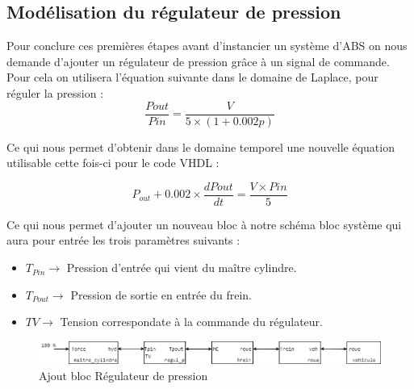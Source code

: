 \newpage
\subsection{Modélisation du régulateur de pression}

Pour conclure ces premières étapes avant d'instancier un système d'ABS on nous demande d'ajouter un régulateur de pression grâce à un signal de commande. Pour cela on utilisera l'équation suivante dans le domaine de Laplace, pour réguler la pression :
\[ \frac{Pout}{Pin} = \frac{V}{5 \times (1 + 0.002p)} \]

Ce qui nous permet d'obtenir dans le domaine temporel une nouvelle équation utilisable cette fois-ci pour le code VHDL :

\[ P_{out} + 0.002 \times \frac{dPout}{dt} = \frac{V \times Pin}{5} \]

Ce qui nous permet d'ajouter un nouveau bloc à notre schéma bloc système qui aura pour entrée les trois paramètres suivants :
\begin{itemize}
    \item $T_{Pin}    \rightarrow$ Pression d'entrée qui vient du maître cylindre.
    \item $T_{Pout}    \rightarrow$ Pression de sortie en entrée du frein.
    \item $TV   \rightarrow$ Tension correspondate à la commande du régulateur.
\end{itemize}

\begin{figure}[h]
    \centering
    \includegraphics[width=\textwidth]{images/sb1.png}
    \caption{Ajout bloc Régulateur de pression}
\end{figure}
\newpage